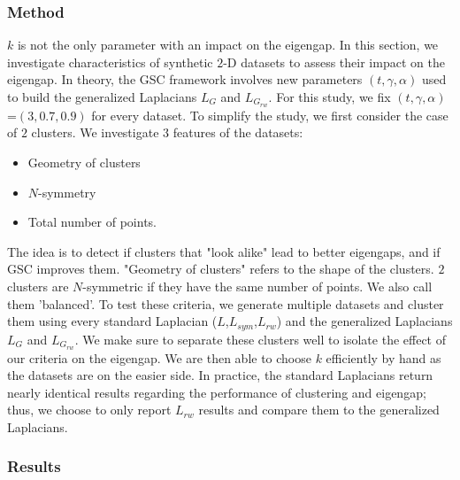 \documentclass[a4paper,12pt]{article}
\theoremstyle{definition}
\theoremstyle{plain}
\begin{document}
\subsubsection{Method}
$k$ is not the only parameter with an impact on the eigengap. In this section, we investigate characteristics of synthetic $2$-D datasets to assess their impact on the eigengap. In theory, the GSC framework involves new parameters $(t,\gamma,\alpha)$ used to build the generalized Laplacians $L_{G}$ and $L_{G_{rw}}$. For this study, we fix $(t,\gamma,\alpha)$=$(3,0.7,0.9)$ for every dataset. To simplify the study, we first consider the case of $2$ clusters. We investigate $3$ features of the datasets:
\begin{itemize}
	\item Geometry of clusters
	\item $N$-symmetry
	\item Total number of points.
\end{itemize}
The idea is to detect if clusters that "look alike" lead to better eigengaps, and if GSC improves them.
"Geometry of clusters" refers to the shape of the clusters. $2$ clusters are $N$-symmetric if they have the same number of points. We also call them 'balanced'.
To test these criteria, we generate multiple datasets and cluster them using every standard Laplacian ($L$,$L_{sym}$,$L_{rw}$) and the generalized Laplacians $L_G$ and $L_{G_{rw}}$. We make sure to separate these clusters well to isolate the effect of our criteria on the eigengap. We are then able to choose $k$ efficiently by hand as the datasets are on the easier side. In practice, the standard Laplacians return nearly identical results regarding the performance of clustering and eigengap; thus, we choose to only report $L_{rw}$ results and compare them to the generalized Laplacians.
\subsubsection{Results}
\end{document}
